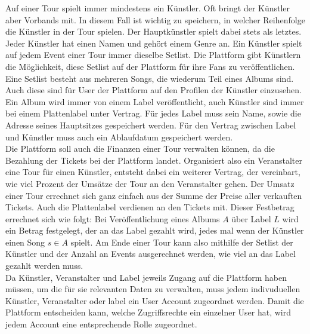 \documentclass[12pt, oneside, a4paper]{article}
\begin{document}
Auf einer Tour spielt immer mindestens ein Künstler. Oft bringt der Künstler aber Vorbands mit. In diesem Fall ist wichtig zu speichern, in welcher Reihenfolge die Künstler in der Tour spielen. Der Hauptkünstler spielt dabei stets als letztes. Jeder Künstler hat einen Namen und gehört einem Genre an.  Ein Künstler spielt auf jedem Event einer Tour immer dieselbe Setlist. Die Plattform gibt Künstlern die Möglichkeit, diese Setlist auf der Plattform für ihre Fans zu veröffentlichen. Eine Setlist besteht aus mehreren Songs, die wiederum Teil eines Albums sind. Auch diese sind für User der Plattform auf den Profilen der Künstler einzusehen. Ein Album wird immer von einem Label veröffentlicht, auch Künstler sind immer bei einem Plattenlabel unter Vertrag. Für jedes Label muss sein Name, sowie die Adresse seines Hauptsitzes gespeichert werden. Für den Vertrag zwischen Label und Künstler muss auch ein Ablaufdatum gespeichert werden.\\
Die Plattform soll auch die Finanzen einer Tour verwalten können, da die Bezahlung der Tickets bei der Plattform landet.  Organisiert also ein Veranstalter eine Tour für einen Künstler, entsteht dabei ein weiterer Vertrag, der vereinbart, wie viel Prozent der Umsätze der Tour an den Veranstalter gehen. Der Umsatz einer Tour errechnet sich ganz einfach aus der Summe der Preise aller verkauften Tickets. Auch die Plattenlabel verdienen an den Tickets mit. Dieser Festbetrag errechnet sich wie folgt: Bei Veröffentlichung eines Albums $A$ über Label $L$ wird ein Betrag festgelegt, der an das Label gezahlt wird, jedes mal wenn der Künstler einen Song $s \in A$ spielt. Am Ende einer Tour kann also mithilfe der Setlist der Künstler und der Anzahl an Events ausgerechnet werden, wie viel an das Label gezahlt werden muss.\\
Da Künstler, Veranstalter und Label jeweils Zugang auf die Plattform haben müssen, um die für sie relevanten Daten zu verwalten, muss jedem indivuduellen Künstler, Veranstalter oder label ein User Account zugeordnet werden. Damit die Plattform entscheiden kann, welche Zugriffsrechte ein einzelner User hat, wird jedem Account eine entsprechende Rolle zugeordnet.

\newpage
\end{document}
